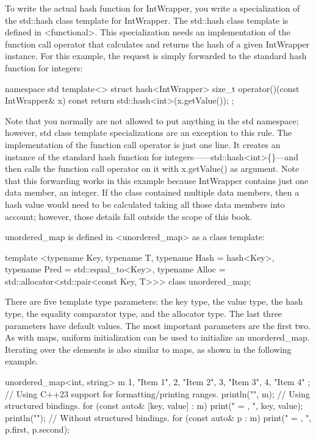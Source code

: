 To write the actual hash function for IntWrapper, you write a specialization of the std::hash class template for IntWrapper. The std::hash class template is defined in <functional>. This specialization needs an implementation of the function call operator that calculates and returns the hash of a given IntWrapper instance. For this example, the request is simply forwarded to the standard hash function for integers:

\begin{cpp}
namespace std
{
    template<> struct hash<IntWrapper>
    {
        size_t operator()(const IntWrapper& x) const {
            return std::hash<int>{}(x.getValue());
        }
    };
}
\end{cpp}

Note that you normally are not allowed to put anything in the std namespace; however, std class template specializations are an exception to this rule. The implementation of the function call operator is just one line. It creates an instance of the standard hash function for integers——std::hash<int>\{\}—and then calls the function call operator on it with x.getValue() as argument. Note that this forwarding works in this example because IntWrapper contains just one data member, an integer. If the class contained multiple data members, then a hash value would need to be calculated taking all those data members into account; however, those details fall outside the scope of this book.


unordered\_map is defined in <unordered\_map> as a class template:

\begin{cpp}
template <typename Key,
          typename T,
          typename Hash = hash<Key>,
          typename Pred = std::equal_to<Key>,
          typename Alloc = std::allocator<std::pair<const Key, T>>>
    class unordered_map;
\end{cpp}

There are five template type parameters: the key type, the value type, the hash type, the equality comparator type, and the allocator type. The last three parameters have default values. The most important parameters are the first two. As with maps, uniform initialization can be used to initialize an unordered\_map. Iterating over the elements is also similar to maps, as shown in the following example.

\begin{cpp}
unordered_map<int, string> m {
    {1, "Item 1"}, {2, "Item 2"}, {3, "Item 3"}, {4, "Item 4"}
};
// Using C++23 support for formatting/printing ranges.
println("{}", m);
// Using structured bindings.
for (const auto& [key, value] : m) { print("{} = {}, ", key, value); }
println("");
// Without structured bindings.
for (const auto& p : m) { print("{} = {}, ", p.first, p.second); }
\end{cpp}

